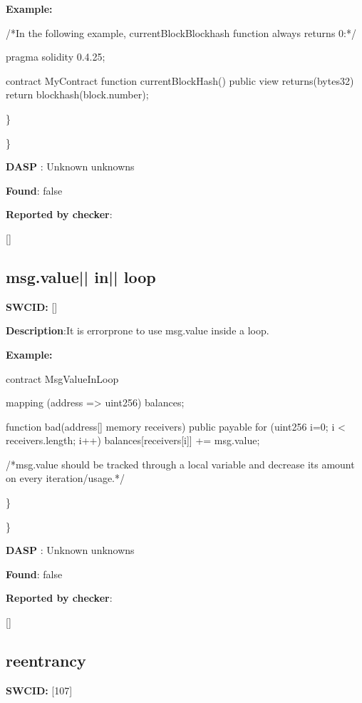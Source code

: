 \documentclass{article}
\begin{document}
\textbf{Example:} 
\begin{ffcode} 

/*In the following example, currentBlockBlockhash function always returns 0:*/ 

pragma solidity 0.4.25;

contract MyContract {
    function currentBlockHash() public view returns(bytes32) {
        return blockhash(block.number);
    }
}

\end{ffcode} 
\} 

\} 

\textbf{DASP} : Unknown unknowns

\textbf{Found}: false

\textbf{Reported by checker}: 
\begin{ffcode} 

[]
\end{ffcode} 
\subsection{msg.value{|\textunderscore| }in{|\textunderscore| }loop} 
\textbf{SWC{\textunderscore }ID:} []

\textbf{Description}:It is error{\textendash}prone to use msg.value inside a loop.


\textbf{Example:} 
\begin{ffcode} 

contract MsgValueInLoop{
    mapping (address => uint256) balances;

    function bad(address[] memory receivers) public payable {
        for (uint256 i=0; i < receivers.length; i++) {
            balances[receivers[i]] += msg.value;
        }
    }
}

 /*msg.value should be tracked through a local variable and decrease its amount on every iteration/usage.*/ 

\end{ffcode} 
\} 

\} 

\textbf{DASP} : Unknown unknowns

\textbf{Found}: false

\textbf{Reported by checker}: 
\begin{ffcode} 

[]
\end{ffcode} 
\subsection{reentrancy} 
\textbf{SWC{\textunderscore }ID:} [107]
\end{document}
